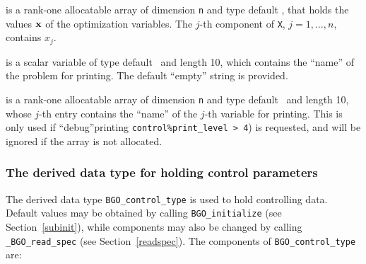 \documentclass{galahad}
\newcommand{\packagename}{BGO}
\newcommand{\fullpackagename}{\libraryname\_\packagename}
\begin{document}
\begin{description}
 is a rank-one allocatable array of dimension {\tt n} and type
default \realdp,
that holds the values ${\mathbf{x}}$ of the optimization variables.
The $j$-th component of {\tt X}, $j = 1,  \ldots , n$, contains $x_{j}$.

 is a scalar variable of type
default \character\ and length 10, which contains the
``name'' of the problem for printing. The default ``empty'' string is
provided.

 is a rank-one allocatable array of dimension {\tt n} and type
default \character\ and length 10, whose $j$-th entry contains the
``name'' of the $j$-th variable for printing. This is only used
if ``debug''printing {\tt control\%print\_level > 4}) is requested,
and will be ignored if the array is not allocated.

\end{description}


\subsubsection{The derived data type for holding control
 parameters}\label{typecontrol}
The derived data type
{\tt \packagename\_control\_type}
is used to hold controlling data. Default values may be obtained by calling
{\tt \packagename\_initialize}
(see Section~\ref{subinit}),
while components may also be changed by calling
{\tt \fullpackagename\_read\-\_spec}
(see Section~\ref{readspec}).
The components of
{\tt \packagename\_control\_type}
are:
\end{document}
